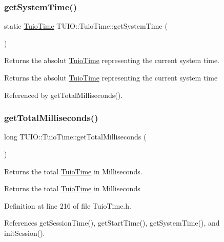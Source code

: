 \subsubsection{\texorpdfstring{get\+System\+Time()}{getSystemTime()}}
{\footnotesize\ttfamily static \hyperlink{class_t_u_i_o_1_1_tuio_time}{Tuio\+Time} T\+U\+I\+O\+::\+Tuio\+Time\+::get\+System\+Time (\begin{DoxyParamCaption}{ }\end{DoxyParamCaption})\hspace{0.3cm}{\ttfamily [static]}}

Returns the absolut \hyperlink{class_t_u_i_o_1_1_tuio_time}{Tuio\+Time} representing the current system time. \begin{DoxyReturn}{Returns}
the absolut \hyperlink{class_t_u_i_o_1_1_tuio_time}{Tuio\+Time} representing the current system time 
\end{DoxyReturn}


Referenced by get\+Total\+Milliseconds().

\mbox{\label{class_t_u_i_o_1_1_tuio_time_a7e861c278e95080b6f087c8c32ed2561}} 
\subsubsection{\texorpdfstring{get\+Total\+Milliseconds()}{getTotalMilliseconds()}}
{\footnotesize\ttfamily long T\+U\+I\+O\+::\+Tuio\+Time\+::get\+Total\+Milliseconds (\begin{DoxyParamCaption}{ }\end{DoxyParamCaption})\hspace{0.3cm}{\ttfamily [inline]}}

Returns the total \hyperlink{class_t_u_i_o_1_1_tuio_time}{Tuio\+Time} in Milliseconds. \begin{DoxyReturn}{Returns}
the total \hyperlink{class_t_u_i_o_1_1_tuio_time}{Tuio\+Time} in Milliseconds 
\end{DoxyReturn}


Definition at line 216 of file Tuio\+Time.\+h.



References get\+Session\+Time(), get\+Start\+Time(), get\+System\+Time(), and init\+Session().



